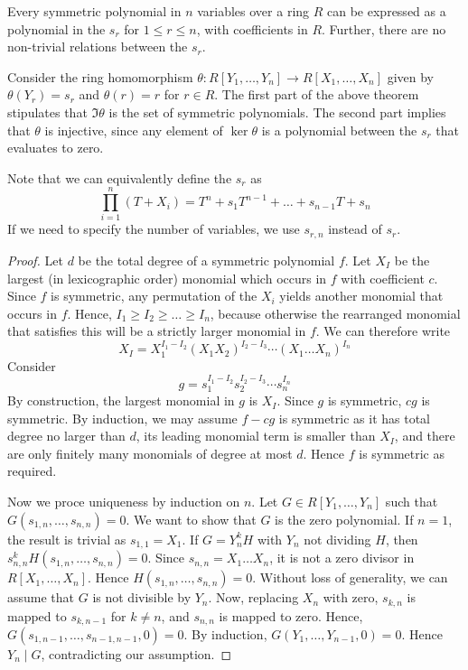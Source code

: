 \begin{theorem}
	Every symmetric polynomial in \( n \) variables over a ring \( R \) can be expressed as a polynomial in the \( s_r \) for \( 1 \leq r \leq n \), with coefficients in \( R \).
	Further, there are no non-trivial relations between the \( s_r \).
\end{theorem}
\begin{remark}
	Consider the ring homomorphism \( \theta \colon R[Y_1, \dots, Y_n] \to R[X_1, \dots, X_n] \) given by \( \theta(Y_r) = s_r \) and \( \theta(r) = r \) for \( r \in R \).
	The first part of the above theorem stipulates that \( \Im \theta \) is the set of symmetric polynomials.
	The second part implies that \( \theta \) is injective, since any element of \( \ker \theta \) is a polynomial between the \( s_r \) that evaluates to zero.

	Note that we can equivalently define the \( s_r \) as
	\[ \prod_{i=1}^n (T + X_i) = T^n + s_1 T^{n-1} + \dots + s_{n-1} T + s_n \]
	If we need to specify the number of variables, we use \( s_{r,n} \) instead of \( s_r \).
\end{remark}
\begin{proof}
	Let \( d \) be the total degree of a symmetric polynomial \( f \).
	Let \( X_I \) be the largest (in lexicographic order) monomial which occurs in \( f \) with coefficient \( c \).
	Since \( f \) is symmetric, any permutation of the \( X_i \) yields another monomial that occurs in \( f \).
	Hence, \( I_1 \geq I_2 \geq \dots \geq I_n \), because otherwise the rearranged monomial that satisfies this will be a strictly larger monomial in \( f \).
	We can therefore write
	\[ X_I = X_1^{I_1 - I_2}(X_1 X_2)^{I_2 - I_3} \cdots (X_1 \dots X_n)^{I_n} \]
	Consider
	\[ g = s_1^{I_1 - I_2} s_2^{I_2 - I_3} \cdots s_n^{I_n} \]
	By construction, the largest monomial in \( g \) is \( X_I \).
	Since \( g \) is symmetric, \( cg \) is symmetric.
	By induction, we may assume \( f - cg \) is symmetric as it has total degree no larger than \( d \), its leading monomial term is smaller than \( X_I \), and there are only finitely many monomials of degree at most \( d \).
	Hence \( f \) is symmetric as required.

	Now we proce uniqueness by induction on \( n \).
	Let \( G \in R[Y_1, \dots, Y_n] \) such that \( G(s_{1,n}, \dots, s_{n,n}) = 0 \).
	We want to show that \( G \) is the zero polynomial.
	If \( n = 1 \), the result is trivial as \( s_{1,1} = X_1 \).
	If \( G = Y^k_n H \) with \( Y_n \) not dividing \( H \), then \( s_{n,n}^k H(s_{1,n}, \dots, s_{n,n}) = 0 \).
	Since \( s_{n,n} = X_1 \dots X_n \), it is not a zero divisor in \( R[X_1, \dots, X_n] \).
	Hence \( H(s_{1,n}, \dots, s_{n,n}) = 0 \).
	Without loss of generality, we can assume that \( G \) is not divisible by \( Y_n \).
	Now, replacing \( X_n \) with zero, \( s_{k,n} \) is mapped to \( s_{k,n-1} \) for \( k \neq n \), and \( s_{n,n} \) is mapped to zero.
	Hence, \( G(s_{1,n-1}, \dots, s_{n-1,n-1}, 0) = 0 \).
	By induction, \( G(Y_1, \dots, Y_{n-1}, 0) = 0 \).
	Hence \( Y_n \mid G \), contradicting our assumption.
\end{proof}
